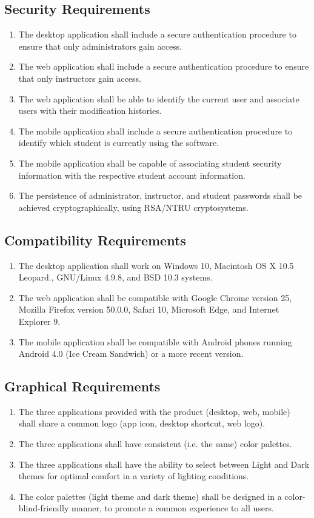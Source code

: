 \documentclass[12pt]{report}
\begin{document}
\subsection{Security Requirements}
\begin{enumerate}[\thesubsection .1]
	\item The desktop application shall include a secure authentication procedure to ensure that only administrators gain access.
	\item The web application shall include a secure authentication procedure to ensure that only instructors gain access.
	\item The web application shall be able to identify the current user and associate users with their modification histories.
	\item The mobile application shall include a secure authentication procedure to identify which student is currently using the software. 
	\item The mobile application shall be capable of associating student security information with the respective student account information.
	\item The persistence of administrator, instructor, and student passwords shall be achieved cryptographically, using RSA/NTRU cryptosystems.
\end{enumerate}

\subsection{Compatibility Requirements}
\begin{enumerate}[\thesubsection .1]
	\item The desktop application shall work on Windows 10, Macintosh OS X 10.5 Leopard., GNU/Linux 4.9.8, and BSD 10.3 systems.
	\item The web application shall be compatible with Google Chrome version 25, Mozilla Firefox version 50.0.0, Safari 10, Microsoft Edge, and Internet Explorer 9.
	\item The mobile application shall be compatible with Android phones running Android 4.0 (Ice Cream Sandwich) or a more recent version.
\end{enumerate}
\subsection{Graphical Requirements}
\begin{enumerate}[\thesubsection .1]
	\item The three applications provided with the product (desktop, web, mobile) shall share a common logo (app icon, desktop shortcut, web logo).
	\item The three applications shall have consistent (i.e. the same) color palettes.
	\item The three applications shall have the ability to select between Light and Dark themes for optimal comfort in a variety of lighting conditions.
	\item The color palettes (light theme and dark theme) shall be designed in a color-blind-friendly manner, to promote a common experience to all users. %
\end{enumerate}
\end{document}
